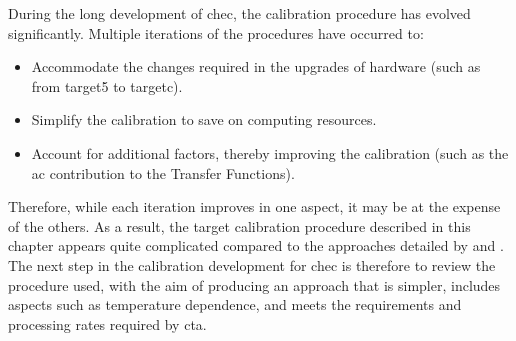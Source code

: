 During the long development of \gls{chec}, the calibration procedure has evolved significantly. Multiple iterations of the procedures have occurred to:
\begin{itemize}
	\item Accommodate the changes required in the upgrades of hardware (such as from \gls{target5} to \gls{targetc}).
	\item Simplify the calibration to save on computing resources.
	\item Account for additional factors, thereby improving the calibration (such as the \gls{ac} contribution to the Transfer Functions).
\end{itemize}
Therefore, while each iteration improves in one aspect, it may be at the expense of the others. As a result, the \gls{target} calibration procedure described in this chapter appears quite complicated compared to the approaches detailed by \textcite{Bechtol2012} and \textcite{Albert2017}. The next step in the calibration development for \gls{chec} is therefore to review the procedure used, with the aim of producing an approach that is simpler, includes aspects such as temperature dependence, and meets the requirements and processing rates required by \gls{cta}.
